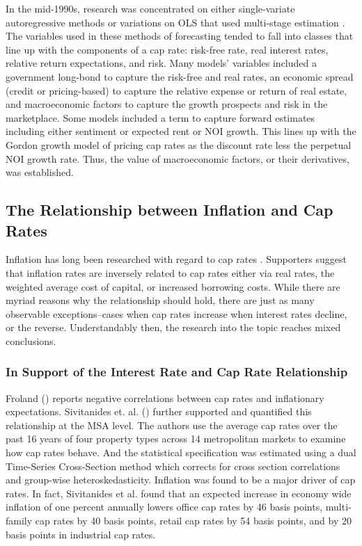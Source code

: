 In the mid-1990s, research was concentrated on either single-variate autoregressive methods \citep*{gau_1984,gau_1985,linneman_1986} or variations on OLS that used multi-stage estimation \citep*{case_shiller_1990,abraham_hendershott_1994}. The variables used in these methods of forecasting tended to fall into classes that line up with the components of a cap rate: risk-free rate, real interest rates, relative return expectations, and risk. Many models’ variables included a government long-bond  to capture the risk-free and real rates, an economic spread (credit or pricing-based) to capture the relative expense or return of real estate, and macroeconomic factors to capture the  growth prospects and risk in the marketplace. Some models included a term to capture forward estimates including either sentiment or expected rent or NOI growth. This lines up with the Gordon growth model of pricing cap rates as the discount rate less the perpetual NOI growth rate. Thus, the value of macroeconomic factors, or their derivatives, was established.

\subsection{The Relationship between Inflation and Cap Rates}

Inflation has long been researched with regard to cap rates \citep*{froland1987determines, sivitanides2001determinants, chandrashekaran2000predictability}. Supporters suggest that inflation rates are inversely related to cap rates either via real rates, the weighted average  cost of capital, or increased borrowing costs. While there are myriad reasons why the relationship should hold, there are just as many observable exceptions--cases when cap rates increase when interest rates decline, or the reverse. Understandably then, the research into the topic reaches mixed conclusions.

\subsubsection{In Support of the Interest Rate and Cap Rate Relationship}
Froland (\citeyear{froland1987determines}) reports negative correlations between cap rates and inflationary expectations. Sivitanides et. al. (\citeyear{sivitanides2001determinants}) further supported and quantified this relationship at the MSA level. The authors use the average cap rates over the past 16 years of four property types across 14 metropolitan markets to examine how cap rates behave. And the statistical specification was estimated using a dual Time-Series Cross-Section method which corrects for cross section correlations and group-wise heteroskedasticity. Inflation was found to be a major driver of cap rates. In fact, Sivitanides et al. found that an expected increase in economy wide inflation of one percent annually lowers office cap rates by 46 basis points, multi-family cap rates by 40 basis points, retail cap rates by 54 basis points, and by 20 basis points in industrial cap rates.

